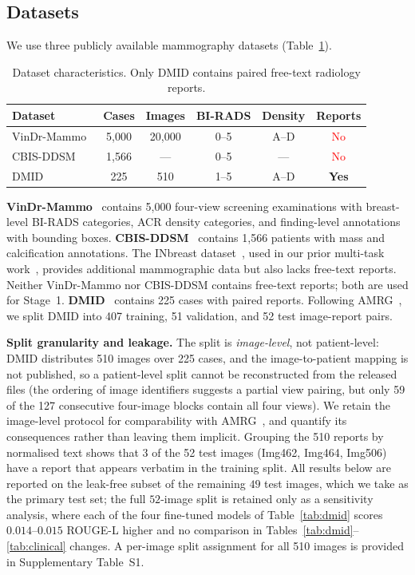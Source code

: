 \documentclass{wlscirep}
\begin{document}
\subsection*{Datasets}

We use three publicly available mammography datasets (Table~\ref{tab:datasets}).

\begin{table}[H]
\centering
\caption{Dataset characteristics. Only DMID contains paired free-text radiology reports.}
\label{tab:datasets}
\begin{tabular}{lccccc}
\toprule
\textbf{Dataset} & \textbf{Cases} & \textbf{Images} & \textbf{BI-RADS} & \textbf{Density} & \textbf{Reports} \\
\midrule
VinDr-Mammo~\cite{nguyen2023vindr} & 5,000 & 20,000 & 0--5 & A--D & \textcolor{red}{No} \\
CBIS-DDSM~\cite{lee2017curated} & 1,566 & --- & 0--5 & --- & \textcolor{red}{No} \\
DMID~\cite{oza2024} & 225 & 510 & 1--5 & A--D & \textcolor{hallucinated}{\textbf{Yes}} \\
\bottomrule
\end{tabular}
\end{table}

\textbf{VinDr-Mammo}~\cite{nguyen2023vindr} contains 5,000 four-view screening examinations with breast-level BI-RADS categories, ACR density categories, and finding-level annotations with bounding boxes. \textbf{CBIS-DDSM}~\cite{lee2017curated} contains 1,566 patients with mass and calcification annotations. The INbreast dataset~\cite{moreira2012inbreast}, used in our prior multi-task work~\cite{esen2025multitask}, provides additional mammographic data but also lacks free-text reports. Neither VinDr-Mammo nor CBIS-DDSM contains free-text reports; both are used for Stage~1. \textbf{DMID}~\cite{oza2024} contains 225 cases with paired reports. Following AMRG~\cite{sung2025}, we split DMID into 407 training, 51 validation, and 52 test image-report pairs.

\textbf{Split granularity and leakage.} The split is \emph{image-level}, not patient-level: DMID distributes 510 images over 225 cases, and the image-to-patient mapping is not published, so a patient-level split cannot be reconstructed from the released files (the ordering of image identifiers suggests a partial view pairing, but only 59 of the 127 consecutive four-image blocks contain all four views). We retain the image-level protocol for comparability with AMRG~\cite{sung2025}, and quantify its consequences rather than leaving them implicit. Grouping the 510 reports by normalised text shows that 3 of the 52 test images (Img462, Img464, Img506) have a report that appears verbatim in the training split. All results below are reported on the leak-free subset of the remaining $49$ test images, which we take as the primary test set; the full $52$-image split is retained only as a sensitivity analysis, where each of the four fine-tuned models of Table~\ref{tab:dmid} scores $0.014$--$0.015$ ROUGE-L higher and no comparison in Tables~\ref{tab:dmid}--\ref{tab:clinical} changes. A per-image split assignment for all 510 images is provided in Supplementary Table~S1.
\end{document}
